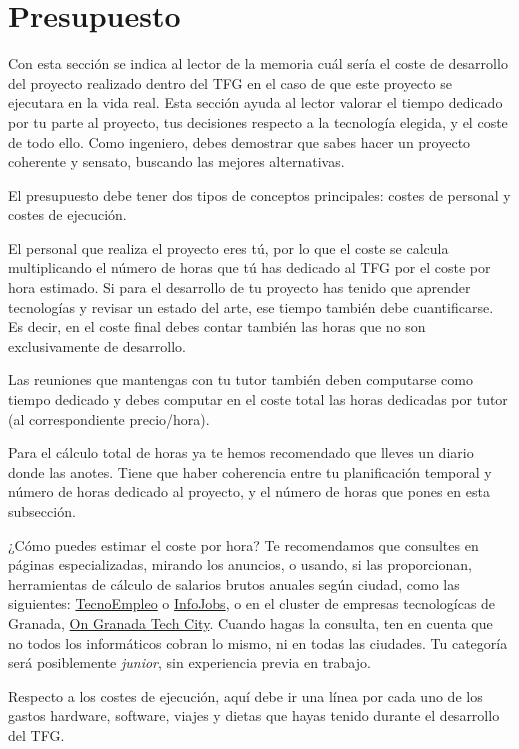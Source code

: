 \section{Presupuesto}

Con esta sección se indica al lector de la memoria cuál sería el coste de desarrollo del proyecto realizado dentro del TFG en el caso de que este proyecto se ejecutara en la vida real. Esta sección ayuda al lector valorar el tiempo dedicado por tu parte al proyecto, tus decisiones respecto a la tecnología elegida, y el coste de todo ello. Como ingeniero, debes demostrar que sabes hacer un proyecto coherente  y sensato, buscando las mejores alternativas. 

El presupuesto debe tener dos tipos de conceptos principales: costes de personal y costes de ejecución.

El personal que realiza el proyecto eres tú, por lo que el coste se calcula multiplicando el número de horas que tú has dedicado al TFG por el coste por hora estimado. Si para el desarrollo de tu proyecto has tenido que aprender tecnologías y revisar un estado del arte, ese tiempo también debe cuantificarse. Es decir, en el coste final debes contar también las horas que no son exclusivamente de desarrollo. 

Las reuniones que mantengas con tu tutor también deben computarse como tiempo dedicado y debes computar en el coste total las horas dedicadas por tutor (al correspondiente precio/hora).

Para el cálculo total de horas ya te hemos recomendado que lleves un diario donde las anotes. Tiene que haber coherencia entre tu planificación temporal y número de horas dedicado al proyecto, y el número de horas que pones en esta subsección.

¿Cómo puedes estimar el coste por hora? Te recomendamos que consultes en páginas especializadas, mirando los anuncios, o usando, si las proporcionan, herramientas de cálculo de salarios brutos anuales según ciudad, como las siguientes: \href{https://www.tecnoempleo.com/ofertas-trabajo/}{TecnoEmpleo} o \href{https://www.tecnoempleo.com/ofertas-trabajo/}{InfoJobs}, o en el cluster de empresas tecnologícas de Granada, \href{https://www.ontechinnovation.com/bolsa-de-trabajo/}{On Granada Tech City}. Cuando hagas la consulta, ten en cuenta que no todos los informáticos cobran lo mismo, ni en todas las ciudades. Tu categoría será posiblemente \textit{junior}, sin experiencia previa en trabajo. 

Respecto a los costes de ejecución, aquí debe ir una línea por cada uno de los gastos hardware, software, viajes y dietas que hayas tenido durante el desarrollo del TFG. 

